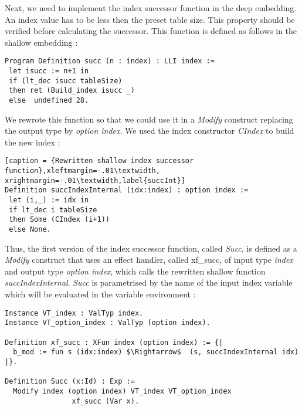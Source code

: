Next, we need to implement the index successor function in the deep embedding. An index value has to be less then the preset table size. This property should be verified before calculating the successor. This function is defined as follows in the shallow embedding :
\begin{lstlisting}[caption = {Index successor function in the shallow embedding},xleftmargin=.04\textwidth,
xrightmargin=.04\textwidth]
Program Definition succ (n : index) : LLI index :=
 let isucc := n+1 in
 if (lt_dec isucc tableSize)
 then ret (Build_index isucc _)
 else  undefined 28.
\end{lstlisting} \vspace{4pt}
We rewrote this function so that we could use it in a \textit{Modify} construct replacing the output type by \textit{option index}. We used the index constructor \textit{CIndex} to build the new index : 
\begin{lstlisting}[caption = {Rewritten shallow index successor function},xleftmargin=-.01\textwidth,
xrightmargin=-.01\textwidth,label{succInt}]
Definition succIndexInternal (idx:index) : option index :=
 let (i,_) := idx in 
 if lt_dec i tableSize 
 then Some (CIndex (i+1)) 
 else None.
\end{lstlisting} \vspace{4pt}
Thus, the first version of the index successor function, called \textit{Succ}, is defined as a \textit{Modify} construct that uses an effect handler, called xf\_succ, of input type \textit{index} and output type \textit{option index}, which calls the rewritten shallow function \textit{succIndexInternal}. \textit{Succ} is parametrised by the name of the input index variable which will be evaluated in the variable environment : \pagebreak
\begin{lstlisting}[caption = {Definition of Succ},xleftmargin=-.02\textwidth,
xrightmargin=-.02\textwidth,mathescape=true]
Instance VT_index : ValTyp index.
Instance VT_option_index : ValTyp (option index).

Definition xf_succ : XFun index (option index) := {|
  b_mod := fun s (idx:index) $\Rightarrow$  (s, succIndexInternal idx)
|}.

Definition Succ (x:Id) : Exp :=
  Modify index (option index) VT_index VT_option_index 
  	            xf_succ (Var x).
\end{lstlisting} \vspace{4pt}

